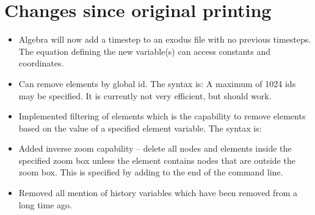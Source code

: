 \section{Changes since original printing}
\begin{itemize}
  \item Algebra will now add a timestep to an exodus file with no previous timesteps.  The equation
	    defining the new variable(s) can access constants and coordinates.

  \item	Can remove elements by global id. The syntax is:
    A maximum of 1024 ids may be specified. It is currently not very efficient, but should work.

  \item Implemented filtering of elements which is the capability
    to remove elements based on the value of a specified element
    variable.  The syntax is:



\item Added inverse zoom capability -- delete all nodes and
  elements inside the specified zoom box unless the element
  contains nodes that are outside the zoom box. This is
  specified by adding  to the end of the
   command line.

\item Removed all mention of history variables which have been removed from \exo{} a long time ago.
\end{itemize}

